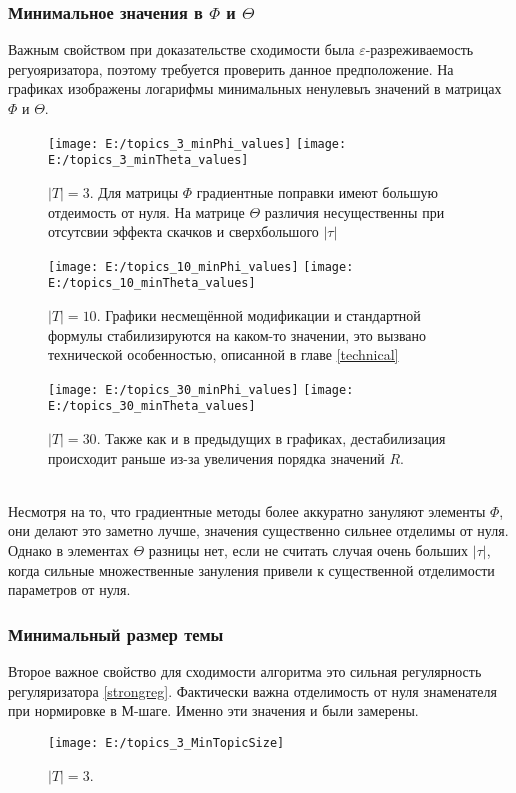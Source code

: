 \documentclass[12pt]{article}
\begin{document}
\subsubsection{Минимальное значения в $\Phi$ и $\Theta$}
Важным свойством при доказательстве сходимости была $\varepsilon$-разреживаемость регуояризатора, поэтому требуется проверить данное предположение. На графиках изображены логарифмы минимальных ненулевыъ значений в матрицах $\Phi$ и $\Theta$.
\begin{figure}[H]
	\centering
	\caption{$|T| = 3$. Для матрицы $\Phi$ градиентные поправки имеют большую отдеимость от нуля. На матрице $\Theta$ различия несущественны при отсутсвии эффекта скачков и сверхбольшого $|\tau|$}    
	\texttt{[image: E:/topics\_3\_minPhi\_values]}
	\texttt{[image: E:/topics\_3\_minTheta\_values]}
\end{figure}
\begin{figure}[H]
	\centering
	\caption{$|T| = 10$. Графики несмещённой модификации и стандартной формулы стабилизируются на каком-то значении, это вызвано технической особенностью, описанной в главе \ref{technical}}    
	\texttt{[image: E:/topics\_10\_minPhi\_values]}
	\texttt{[image: E:/topics\_10\_minTheta\_values]}
\end{figure}
\begin{figure}[H]
	\centering
	\caption{$|T| = 30$. Также как и в предыдущих в графиках, дестабилизация происходит раньше из-за увеличения порядка значений $R$.}    
	\texttt{[image: E:/topics\_30\_minPhi\_values]}
	\texttt{[image: E:/topics\_30\_minTheta\_values]}
\end{figure}
\ \\
Несмотря на то, что градиентные методы более аккуратно  зануляют элементы $\Phi$, они делают это заметно лучше, значения существенно сильнее отделимы от нуля. Однако в элементах $\Theta$ разницы нет, если не считать случая очень больших $|\tau|$, когда сильные множественные зануления привели к существенной отделимости параметров от нуля.
\subsubsection{Минимальный размер темы}
Второе важное свойство для сходимости алгоритма это сильная регулярность регуляризатора \ref{strongreg}. Фактически важна отделимость от нуля знаменателя при нормировке в М-шаге. Именно эти значения  и были замерены.
\begin{figure}[H]
	\centering
	\caption{$|T| = 3$.}    
	\texttt{[image: E:/topics\_3\_MinTopicSize]}
\end{figure}
\end{document}
